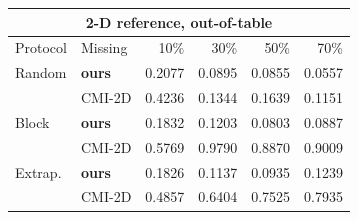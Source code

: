 \vspace{2pt}

\begin{tabular}{llrrrr}\toprule
\multicolumn{6}{c}{2-D reference, out-of-table} \\\midrule
Protocol & Missing & 10\% & 30\% & 50\% & 70\% \\\midrule
Random & \textbf{ours} & 0.2077 & 0.0895 & 0.0855 & 0.0557 \\
 & CMI-2D & 0.4236 & 0.1344 & 0.1639 & 0.1151 \\
\addlinespace
Block & \textbf{ours} & 0.1832 & 0.1203 & 0.0803 & 0.0887 \\
 & CMI-2D & 0.5769 & 0.9790 & 0.8870 & 0.9009 \\
\addlinespace
Extrap. & \textbf{ours} & 0.1826 & 0.1137 & 0.0935 & 0.1239 \\
 & CMI-2D & 0.4857 & 0.6404 & 0.7525 & 0.7935 \\
\bottomrule\end{tabular}
